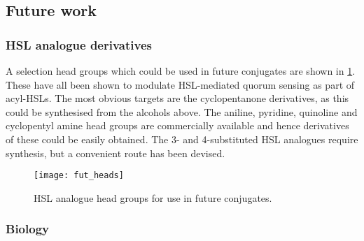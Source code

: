 \subsection{Future work \label{sec:Fut2}}

\subsubsection{HSL analogue derivatives}

A selection head groups which could be used in future conjugates are shown in \ref{fgr:fut_heads}. These have all been shown to modulate HSL-mediated quorum sensing as part of acyl-HSLs\cite{Smith2003a,Welch2005,Ishida2007,Olsen2002,Smith2003,Hodgkinson2012a,Marsden2010}. The most obvious targets are the cyclopentanone derivatives, as this could be synthesised from the alcohols above. The aniline, pyridine, quinoline and cyclopentyl amine head groups are commercially available and hence derivatives of these could be easily obtained. The 3- and 4-substituted HSL analogues require synthesis, but a convenient route has been devised\cite{Olsen2002}.

\begin{figure}[H]
	\begin{center}
		\texttt{[image: fut\_heads]}
		\caption{HSL analogue head groups for use in future conjugates.
		\label{fgr:fut_heads}}
	\end{center}
\end{figure}

\subsubsection{Biology}